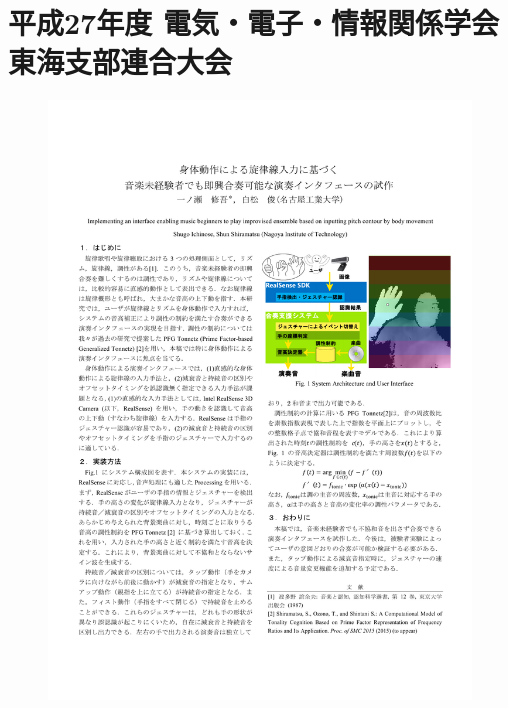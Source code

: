 \cleardoublepage
\chapter{平成27年度 電気・電子・情報関係学会 東海支部連合大会}
\begin{figure}[ht]
    \begin{center}
        \includegraphics[width=1.0\linewidth]{part/A.IPSJrengou2014/ichinose2015tokai0717.pdf}
    \end{center}
\end{figure}

\clearpage
